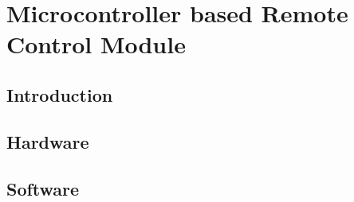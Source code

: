 \chapter{Microcontroller based Remote Control Module}

\section{Introduction}
\section{Hardware}
\section{Software}


